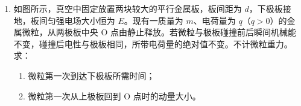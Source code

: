 \documentclass[\gkver]{gaokaozhenti}
\begin{document}
\begin{enumerate}
{（2）由于滑动变阻器采用限流式接法，应将其串联接在电路中，故采用“一上一下”原则，即电流表的“+”接线柱应与滑动变阻器的接线柱 a 相连。

为了保护电路，闭合开关前，滑动变阻器滑片应最大阻值处，即最左端。

（3）由题意可知，该合金丝的电阻为 $R = 3.2 \UO$

由电阻定律 $R = \rho\frac{l}{S}$ 及 $S = \pi\left(\frac{d}{2}\right)^{2}$ 可得 $\rho = \frac{\pi R d^{2}}{4l}$

其中 $d = 0.500 \Umm$，$l = 70.00 \Ucm - 20.00 \Ucm = 50.00 \Ucm$

代入数据解得该合金丝的电阻率为 $\rho \approx 1.3\times10^{-6} \UOm$

（4）根据电阻定律可知 $\rho = \frac{\pi R d^{2}}{4l}$，则为了减小实验误差，可减小测合金丝电阻时的误差，选择更精确的电阻箱，可换用阻值范围为 $0 \sim 99.99 \UO$，或多次测量该合金丝不同区间等长度样品的电阻率，再求平均值。

故选 CD。
}

\item
如图所示，真空中固定放置两块较大的平行金属板，板间距为 $d$，下极板接地，板间匀强电场大小恒为 $E$。现有一质量为 $m$、电荷量为 $q$（$q > 0$）的金属微粒，从两极板中央 O 点由静止释放。若微粒与极板碰撞前后瞬间机械能不变，碰撞后电性与极板相同，所带电荷量的绝对值不变。不计微粒重力。求：
\begin{enumerate}
	\item
	微粒第一次到达下极板所需时间；
	\item
	微粒第一次从上极板回到 O 点时的动量大小。
\end{enumerate}


\end{enumerate}
\end{document}
